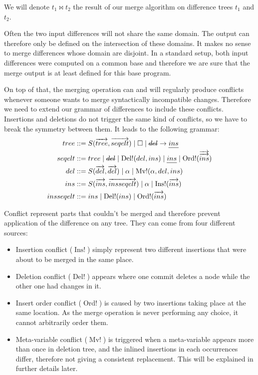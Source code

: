 \documentclass[a4paper,11pt]{article}
\newcommand\typsep{\mathrel{|}}
\newcommand\merge{\mathbin{\Join}}
\newcommand\mathst[1]{\text{\st{$#1$}}}
\newcommand\mathul[1]{\text{\ul{$#1$}}}
\newcommand\id{\square}
\newcommand\change[2]{\mathst{#1} \rightarrow \mathul{#2}}
\DeclareMathOperator\InsConflict{Ins!}
\DeclareMathOperator\DelConflict{Del!}
\DeclareMathOperator\OrdConflict{Ord!}
\DeclareMathOperator\MvConflict{Mv!}
\begin{document}
We will denote $t_1 \merge t_2$ the result of our merge algorithm on difference trees $t_1$ and $t_2$.
  
Often the two input differences will not share the same domain. The output can therefore only be defined on the intersection of these domains. It makes no sense to merge differences whose domain are disjoint. In a standard setup, both input differences were computed on a common base and therefore we are sure that the merge output is at least defined for this base program.

On top of that, the merging operation can and will regularly produce conflicts whenever someone wants to merge syntactically incompatible changes.
Therefore we need to extend our grammar of differences to include these conflicts. Insertions and deletions do not trigger the same kind of conflicts, so we have to break the symmetry between them. It leads to the following grammar:
\begin{align*}
tree &::= S(\overrightarrow{tree}, \overrightarrow{seqelt}) \typsep \id \typsep  \change{del}{ins}\\
seqelt &::= tree \typsep \mathst{del} \typsep \DelConflict(del, ins) \typsep \mathul{ins} \typsep \OrdConflict(\overrightarrow{\overrightarrow{ins}})\\
del &::= S(\overrightarrow{del}, \overrightarrow{del}) \typsep \alpha \typsep \MvConflict(\alpha, del, ins) \\
ins &::= S(\overrightarrow{ins}, \overrightarrow{insseqelt}) \typsep \alpha \typsep \InsConflict(\overrightarrow{ins})\\
insseqelt &::= ins \typsep \DelConflict(ins) \typsep \OrdConflict(\overrightarrow{ins})\\
\end{align*}

Conflict represent parts that couldn't be merged and therefore prevent application of the difference on any tree. They can come from four different sources:
\begin{itemize}
  \item Insertion conflict ($\InsConflict$) simply represent two different insertions that were about to be merged in the same place.
  \item Deletion conflict ($\DelConflict$) appears where one commit deletes a node while the other one had changes in it.
  \item Insert order conflict ($\OrdConflict$) is caused by two insertions taking place at the same location. As the merge operation is never performing any choice, it cannot arbitrarily order them.
  \item Meta-variable conflict ($\MvConflict$) is triggered when a meta-variable appears more than once in deletion tree, and the inlined insertions in each occurrences differ, therefore not giving a consistent replacement. This will be explained in further details later.
\end{itemize}
\end{document}
